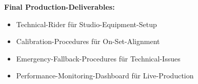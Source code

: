 \textbf{Final Production-Deliverables:}
\begin{itemize}
    \item Technical-Rider für Studio-Equipment-Setup
    \item Calibration-Procedures für On-Set-Alignment
    \item Emergency-Fallback-Procedures für Technical-Issues
    \item Performance-Monitoring-Dashboard für Live-Production
\end{itemize}
